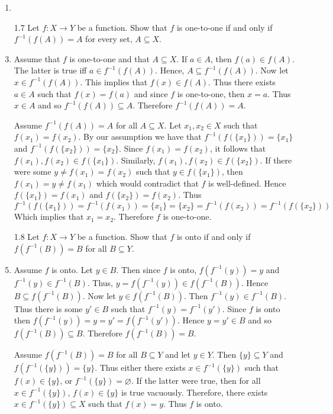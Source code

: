 \documentclass[12pt]{article}
\makeatletter
\theoremstyle{definition}
\theoremstyle{remark}
\renewenvironment{proof}[1][\proofname]{\par
  \pushQED{\qed}%
  \normalfont \topsep6\p@\@plus6\p@\relax
  \list{}{\leftmargin=0mm
          \rightmargin=4mm
          \settowidth{\itemindent}{\itshape#1}%
          \labelwidth=\itemindent
          \parsep=0pt \listparindent=\parindent 
  }
  \item[\hskip\labelsep
        \itshape
    #1\@addpunct{.}]\ignorespaces
}{%
  \popQED\endlist\@endpefalse
}
\let\oldproofname=\proofname
\renewcommand{\proofname}{\bf{\textit{\oldproofname}}}
\makeatother
\begin{document}
\begin{enumerate}[leftmargin=*]
\begin{proof}
            \end{proof}\newpage
        \item[1.7] Let $f\colon X\rightarrow Y$ be a function. Show that $f$ is one-to-one if and only if $f^{-1}(f(A))=A$ for every set, $A\subseteq X$.
            \begin{proof}
                Assume that $f$ is one-to-one and that $A\subseteq X$. If $a\in A$, then $f(a)\in f(A)$. The latter is true iff $a\in f^{-1}(f(A))$. Hence, $A\subseteq f^{-1}(f(A))$. Now let $x\in f^{-1}(f(A))$. This implies that $f(x)\in f(A)$. Thus there exists $a\in A$ such that $f(x)=f(a)$ and since $f$ is one-to-one, then $x=a$. Thus $x\in A$ and so $f^{-1}(f(A))\subseteq A$. Therefore $f^{-1}(f(A))=A$.\par\hspace{4mm} Assume $f^{-1}(f(A))=A$ for all $A\subseteq X$. Let $x_1,x_2\in X$ such that $f(x_1)=f(x_2)$. By our assumption we have that $f^{-1}(f(\{x_1\}))=\{x_1\}$ and $f^{-1}(f(\{x_2\}))=\{x_2\}$. Since $f(x_1)=f(x_2)$, it follows that $f(x_1), f(x_2)\in f(\{x_1\})$. Similarly, $f(x_1), f(x_2)\in f(\{x_2\})$. If there were some $y\neq f(x_1)=f(x_2)$ such that $y\in f(\{x_1\})$, then $f(x_1)=y\neq f(x_1)$ which would contradict that $f$ is well-defined. Hence $f(\{x_1\})=f(x_1)$ and $f(\{x_2\})=f(x_2)$. Thus
                    \begin{equation*}
                        f^{-1}(f(\{x_1\}))=f^{-1}(f(x_1))=\{x_1\}=\{x_2\}=f^{-1}(f(x_2))=f^{-1}(f(\{x_2\}))
                    \end{equation*}
                Which implies that $x_1=x_2$. Therefore $f$ is one-to-one.
            \end{proof}
        \item[1.8] Let $f\colon X\rightarrow Y$ be a function. Show that $f$ is onto if and only if $f(f^{-1}(B))=B$ for all $B\subseteq Y$.
            \begin{proof}
                Assume $f$ is onto. Let $y\in B$. Then since $f$ is onto, $f(f^{-1}(y))=y$ and $f^{-1}(y)\in f^{-1}(B)$. Thus, $y=f(f^{-1}(y))\in f(f^{-1}(B))$. Hence $B\subseteq f(f^{-1}(B))$. Now let $y\in f(f^{-1}(B))$. Then $f^{-1}(y)\in f^{-1}(B)$. Thus there is some $y'\in B$ such that $f^{-1}(y)=f^{-1}(y')$. Since $f$ is onto then $f(f^{-1}(y))=y=y'=f(f^{-1}(y'))$. Hence $y=y'\in B$ and so $f(f^{-1}(B))\subseteq B$. Therefore $f(f^{-1}(B))=B$.\par\hspace{4mm} Assume $f(f^{-1}(B))=B$ for all $B\subseteq Y$ and let $y\in Y$. Then $\{y\}\subseteq Y$ and $f(f^{-1}(\{y\}))=\{y\}$. Thus either there exists $x\in f^{-1}(\{y\})$ such that $f(x)\in \{y\}$, or $f^{-1}(\{y\})=\varnothing$. If the latter were true, then for all $x\in f^{-1}(\{y\})$,  $f(x)\in\{y\}$ is true vacuously. Therefore, there exists $x\in f^{-1}(\{y\})\subseteq X$ such that $f(x)=y$. Thus $f$ is onto.

\end{proof}
\end{enumerate}
\end{document}

